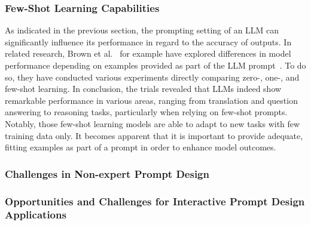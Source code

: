 \subsubsection{Few-Shot Learning Capabilities}
As indicated in the previous section, the prompting setting of an LLM can significantly influence its
performance in regard to the accuracy of outputs.
In related research, Brown et al\(.\)~\cite{brown_language_2020} for example have explored differences
in model performance depending on examples provided as part of the LLM prompt~\cite{brown_language_2020}.
To do so, they have conducted various experiments directly comparing zero-, one-, and few-shot learning.
In conclusion, the trials revealed that LLMs indeed show remarkable performance in various areas,
ranging from translation and question answering to reasoning tasks, particularly when relying on few-shot
prompts.
Notably, those few-shot learning models are able to adapt to new tasks with few training data only.
It becomes apparent that it is important to provide adequate, fitting examples as part of a prompt in order
to enhance model outcomes.

\subsubsection{Challenges in Non-expert Prompt Design}

\subsubsection{Opportunities and Challenges for Interactive Prompt Design Applications}



